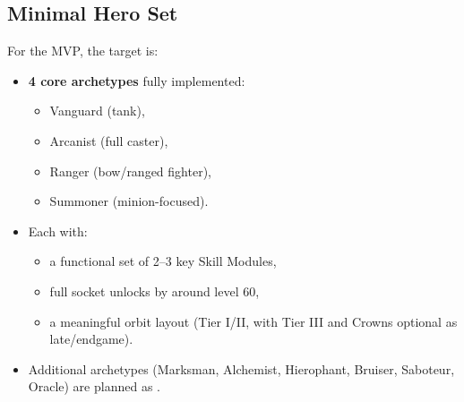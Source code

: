 \subsection{Minimal Hero Set}

For the MVP, the target is:

\begin{itemize}
	\item \textbf{4 core archetypes} fully implemented:
	\begin{itemize}
		\item Vanguard (tank),
		\item Arcanist (full caster),
		\item Ranger (bow/ranged fighter),
		\item Summoner (minion-focused).
	\end{itemize}
	\item Each with:
	\begin{itemize}
		\item a functional set of 2--3 key Skill Modules,
		\item full socket unlocks by around level 60,
		\item a meaningful orbit layout (Tier I/II, with Tier III and Crowns optional as late/endgame).
	\end{itemize}
	\item Additional archetypes (Marksman, Alchemist, Hierophant, Bruiser, Saboteur, Oracle) 
	are planned as .
\end{itemize}

